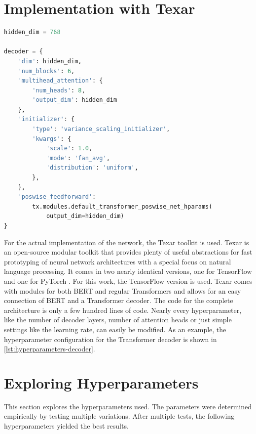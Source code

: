\section{Implementation with Texar}

\begin{lstlisting}[numbers=none,language=Python,caption={Hyperparameters for Transformer decoder},captionpos=b,label=lst:hyperparameters-decoder]
hidden_dim = 768

decoder = {
    'dim': hidden_dim,
    'num_blocks': 6,
    'multihead_attention': {
        'num_heads': 8,
        'output_dim': hidden_dim
    },
    'initializer': {
        'type': 'variance_scaling_initializer',
        'kwargs': {
            'scale': 1.0,
            'mode': 'fan_avg',
            'distribution': 'uniform',
        },
    },
    'poswise_feedforward': 
        tx.modules.default_transformer_poswise_net_hparams(
            output_dim=hidden_dim)
}
\end{lstlisting}

For the actual implementation of the network, the Texar toolkit \cite{hu2019texar} is used.
Texar is an open-source modular toolkit that provides plenty of useful abstractions for fast prototyping of neural network architectures with a special focus on natural language processing.
It comes in two nearly identical versions, one for TensorFlow \cite{tensorflow2015-whitepaper} and one for PyTorch \cite{NEURIPS2019_9015}.  
For this work, the TensorFlow version is used.
Texar comes with modules for both BERT and regular Transformers and allows for an easy connection of BERT and a Transformer decoder.
The code for the complete architecture is only a few hundred lines of code.
Nearly every hyperparameter, like the number of decoder layers, number of attention heads or just simple settings like the learning rate, can easily be modified.
As an example, the hyperparameter configuration for the Transformer decoder is shown in \cref{lst:hyperparameters-decoder}.


\section{Exploring Hyperparameters}

This section explores the hyperparameters used.
The parameters were determined empirically by testing multiple variations.
After multiple tests, the following hyperparameters yielded the best results.

